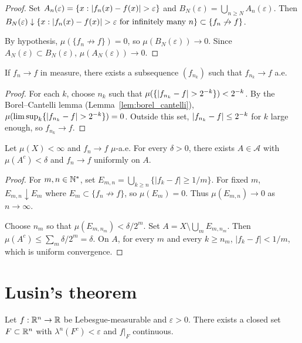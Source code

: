 \begin{proof}
Set $A_n(\varepsilon) = \{x : \left| f_n(x) - f(x) \right| > \varepsilon\}$ and
$B_N(\varepsilon) = \bigcup_{n \geq N} A_n(\varepsilon)$. Then
$B_N(\varepsilon) \downarrow \{x : \left| f_n(x) - f(x) \right| > \varepsilon \text{ for
infinitely many } n\} \subset \{f_n \not\to f\}$.

By hypothesis, $\mu(\{f_n \not\to f\}) = 0$, so $\mu(B_N(\varepsilon)) \to 0$.
Since $A_N(\varepsilon) \subset B_N(\varepsilon)$,
$\mu(A_N(\varepsilon)) \to 0$.
\end{proof}

\begin{theorem}
If $f_n \to f$ in measure, there exists a subsequence $(f_{n_k})$ such that
$f_{n_k} \to f$ a.e.
\end{theorem}

\begin{proof}
For each $k$, choose $n_k$ such that
$\mu(\{\left| f_{n_k} - f \right| > 2^{-k}\}) < 2^{-k}$. By the Borel--Cantelli lemma
(Lemma~\ref{lem:borel_cantelli}), $\mu(\limsup_k \{\left| f_{n_k} - f \right| > 2^{-k}\})
= 0$. Outside this set, $\left| f_{n_k} - f \right| \leq 2^{-k}$ for $k$ large enough, so
$f_{n_k} \to f$.
\end{proof}

\begin{theorem}[Egorov]
\label{thm:egorov}
Let $\mu(X) < \infty$ and $f_n \to f$ $\mu$-a.e. For every $\delta > 0$, there
exists $A \in \mathcal{A}$ with $\mu(A^c) < \delta$ and $f_n \to f$ uniformly on $A$.
\end{theorem}

\begin{proof}
For $m, n \in \mathbb{N}^*$, set $E_{m,n} = \bigcup_{k \geq n} \{|f_k - f| \geq 1/m\}$.
For fixed $m$, $E_{m,n} \downarrow E_m$ where $E_m \subset \{f_n \not\to f\}$, so
$\mu(E_m) = 0$. Thus $\mu(E_{m,n}) \to 0$ as $n \to \infty$.

Choose $n_m$ so that $\mu(E_{m,n_m}) < \delta/2^m$. Set
$A = X \setminus \bigcup_m E_{m,n_m}$. Then
$\mu(A^c) \leq \sum_m \delta/2^m = \delta$. On $A$, for every $m$ and every
$k \geq n_m$, $|f_k - f| < 1/m$, which is uniform convergence.
\end{proof}

\section{Lusin's theorem}

\begin{theorem}[Lusin]
\label{thm:lusin}
Let $f : \mathbb{R}^n \to \mathbb{R}$ be Lebesgue-measurable and $\varepsilon > 0$. There exists a
closed set $F \subset \mathbb{R}^n$ with $\lambda^n(F^c) < \varepsilon$ and $f|_F$
continuous.
\end{theorem}

